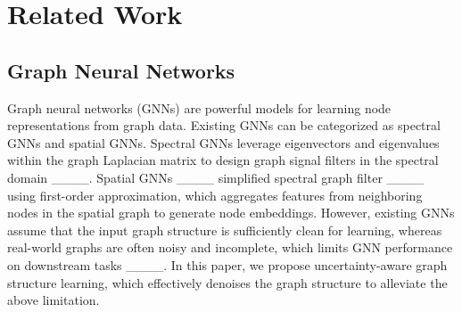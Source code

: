 \section{Related Work}
\label{sec5}
\subsection{Graph Neural Networks}
Graph neural networks (GNNs) are powerful models for learning node representations from graph data.
Existing GNNs can be categorized as spectral GNNs and spatial GNNs.
Spectral GNNs leverage eigenvectors and eigenvalues within the graph Laplacian matrix to design graph signal filters in the spectral domain ____.
Spatial GNNs ____ simplified spectral graph filter ____ using first-order approximation, which aggregates features from neighboring nodes in the spatial graph to generate node embeddings.
However, existing GNNs assume that the input graph structure is sufficiently clean for learning, whereas real-world graphs are often noisy and incomplete, which limits GNN performance on downstream tasks ____.
In this paper, we propose uncertainty-aware graph structure learning, which effectively denoises the graph structure to alleviate the above limitation.





